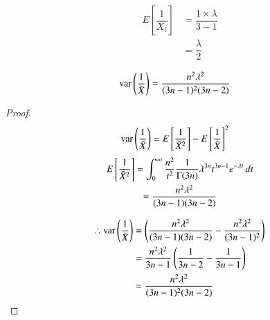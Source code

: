         \begin{corollary}
        \label{stats/4/expxi}
         \begin{align}
           E \left[  \dfrac{1}{X_i}  \right] &= \dfrac{1 \times\lambda}{3-1}  \\
          &= \dfrac{\lambda}{2}
          \end{align}
        \end{corollary}
        \begin{lemma}
        \label{stats/4/varxbar}
        \begin{align}
            \text{var}\left( \dfrac{1}{\Bar{X}} \right) &= \dfrac{n^2\lambda^2}{(3n-1)^2(3n-2)}
        \end{align}
        \end{lemma}
        \begin{proof}
         \begin{align}
           \text{var}\left( \dfrac{1}{\Bar{X}} \right)    &=   E \left[   {\dfrac{1}{\Bar{X}^2}}  \right] - { E \left[   \dfrac{1}{\Bar{X}}  \right]}^2
         \end{align}
         \begin{multline}
              E \left[   {\dfrac{1}{\Bar{X}^2}}  \right] = \int_{0}^{\infty} \dfrac{n^2}{t^2} \dfrac{1}{\Gamma(3n)} \lambda^{3n}t^{3n-1}e^{-\lambda t}\,dt \\
              = \dfrac{n^2\lambda^2}{(3n-1)(3n-2)} 
         \end{multline}
        
        \begin{align}
            \therefore    \text{var}\left( \dfrac{1}{\Bar{X}} \right) &= \left(\dfrac{n^2\lambda^2}{(3n-1)(3n-2)} - \dfrac{n^2\lambda^2}{(3n-1)^2}\right) \\
            &= \dfrac{n^2\lambda^2}{3n-1} \left(\dfrac{1}{3n-2}- \dfrac{1}{3n-1}\right) \\
            &= \dfrac{n^2\lambda^2}{(3n-1)^2(3n-2)}
        \end{align}
        \end{proof}
